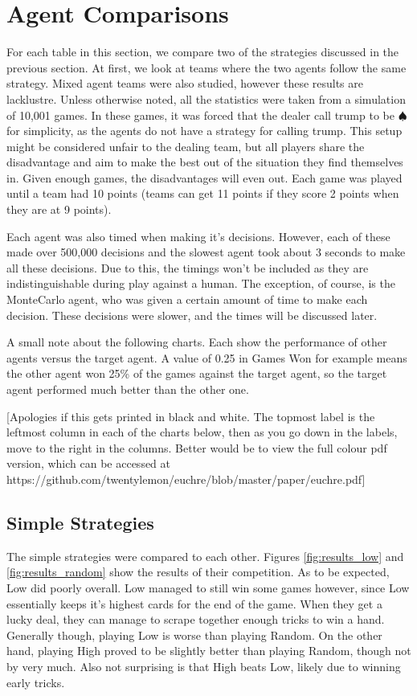 
\section{Agent Comparisons}

For each table in this section, we compare two of the strategies discussed in the previous section. At first, we look at
teams where the two agents follow the same strategy. Mixed agent teams were also studied, however these results are lacklustre.
Unless otherwise noted, all the statistics were taken from a simulation of 10,001 games. In these games, it was forced
that the dealer call trump to be $\spadesuit$ for simplicity, as the agents do not have a strategy for calling trump.
This setup might be considered unfair to the dealing team, but all players share the disadvantage and aim to make the best
out of the situation they find themselves in. Given enough games, the disadvantages will even out.
Each game was played until a team had 10 points (teams can get 11 points if they score 2 points when they are at 9 points).

Each agent was also timed when making it's decisions. However, each of these made over 500,000 decisions and the slowest
agent took about 3 seconds to make all these decisions. Due to this, the timings won't be included as they are indistinguishable
during play against a human. The exception, of course, is the MonteCarlo agent, who was given a certain amount of time to make each
decision. These decisions were slower, and the times will be discussed later.

A small note about the following charts. Each show the performance of other agents versus the target agent. A value of 0.25 in Games Won
for example means the other agent won 25\% of the games against the target agent, so the target agent performed much better than the other one.

[Apologies if this gets printed in black and white. The topmost label is the leftmost column in each of the charts below, then as you
go down in the labels, move to the right in the columns. Better would be to view the full colour pdf version,
which can be accessed at https://github.com/twentylemon/euchre/blob/master/paper/euchre.pdf]


\subsection{Simple Strategies}

The simple strategies were compared to each other. Figures \ref{fig:results_low} and \ref{fig:results_random} show the results of their competition.
As to be expected, Low did poorly overall. Low managed to still win some games however, since Low essentially keeps it's highest cards for the
end of the game. When they get a lucky deal, they can manage to scrape together enough tricks to win a hand. Generally though, playing Low is
worse than playing Random. On the other hand, playing High proved to be slightly better than playing Random, though not by very much.
Also not surprising is that High beats Low, likely due to winning early tricks.

